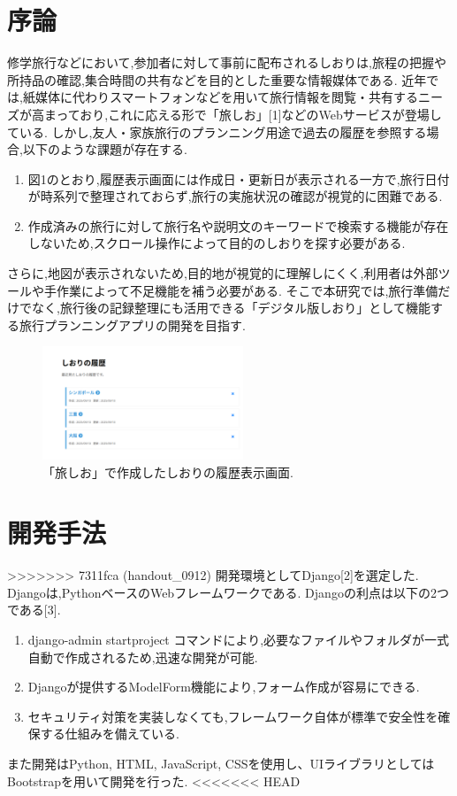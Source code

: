 \documentclass[a4j,twocolumn]{jsarticle}
\begin{document}
\section{序論}
\label{sec:org9649b3d}
修学旅行などにおいて,参加者に対して事前に配布されるしおりは,旅程の把握や所持品の確認,集合時間の共有などを目的とした重要な情報媒体である.
近年では,紙媒体に代わりスマートフォンなどを用いて旅行情報を閲覧・共有するニーズが高まっており,これに応える形で「旅しお」[1]などのWebサービスが登場している.
しかし,友人・家族旅行のプランニング用途で過去の履歴を参照する場合,以下のような課題が存在する.
\begin{enumerate}
\item 図1のとおり,履歴表示画面には作成日・更新日が表示される一方で,旅行日付が時系列で整理されておらず,旅行の実施状況の確認が視覚的に困難である.
\item 作成済みの旅行に対して旅行名や説明文のキーワードで検索する機能が存在しないため,スクロール操作によって目的のしおりを探す必要がある.
\end{enumerate}
さらに,地図が表示されないため,目的地が視覚的に理解しにくく,利用者は外部ツールや手作業によって不足機能を補う必要がある.
そこで本研究では,旅行準備だけでなく,旅行後の記録整理にも活用できる「デジタル版しおり」として機能する旅行プランニングアプリの開発を目指す.

\begin{figure}[htbp]
\centering
\includegraphics[width=6cm]{./figs/rireki1.png}
\caption{\label{fig:org52c9423}「旅しお」で作成したしおりの履歴表示画面.}
\end{figure}

\section{開発手法}
\label{sec:org3064364}
>>>>>>> 7311fca (handout_0912)
開発環境としてDjango[2]を選定した.
Djangoは,PythonベースのWebフレームワークである.
Djangoの利点は以下の2つである[3].
\begin{enumerate}
\item django-admin startproject コマンドにより,必要なファイルやフォルダが一式自動で作成されるため,迅速な開発が可能.
\item Djangoが提供するModelForm機能により,フォーム作成が容易にできる.
\item セキュリティ対策を実装しなくても,フレームワーク自体が標準で安全性を確保する仕組みを備えている.
\end{enumerate}
また開発はPython, HTML, JavaScript, CSSを使用し、UIライブラリとしてはBootstrapを用いて開発を行った.
<<<<<<< HEAD
\end{document}
